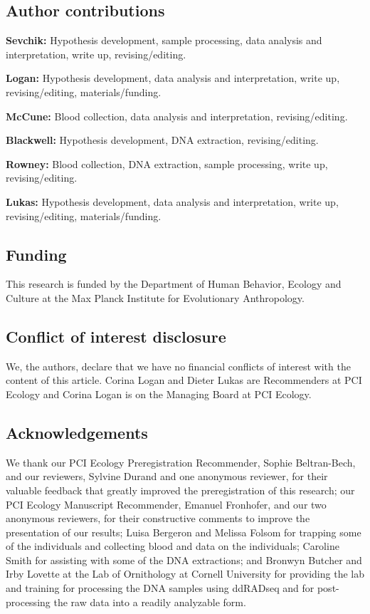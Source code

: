 \documentclass[
]{article}
\begin{document}
\hypertarget{author-contributions}{%
\subsection{Author contributions}\label{author-contributions}}

\textbf{Sevchik:} Hypothesis development, sample processing, data
analysis and interpretation, write up, revising/editing.

\textbf{Logan:} Hypothesis development, data analysis and
interpretation, write up, revising/editing, materials/funding.

\textbf{McCune:} Blood collection, data analysis and interpretation,
revising/editing.

\textbf{Blackwell:} Hypothesis development, DNA extraction,
revising/editing.

\textbf{Rowney:} Blood collection, DNA extraction, sample processing,
write up, revising/editing.

\textbf{Lukas:} Hypothesis development, data analysis and
interpretation, write up, revising/editing, materials/funding.

\hypertarget{funding}{%
\subsection{Funding}\label{funding}}

This research is funded by the Department of Human Behavior, Ecology and
Culture at the Max Planck Institute for Evolutionary Anthropology.

\hypertarget{conflict-of-interest-disclosure}{%
\subsection{Conflict of interest
disclosure}\label{conflict-of-interest-disclosure}}

We, the authors, declare that we have no financial conflicts of interest
with the content of this article. Corina Logan and Dieter Lukas are
Recommenders at PCI Ecology and Corina Logan is on the Managing Board at
PCI Ecology.

\hypertarget{acknowledgements}{%
\subsection{Acknowledgements}\label{acknowledgements}}

We thank our PCI Ecology Preregistration Recommender, Sophie
Beltran-Bech, and our reviewers, Sylvine Durand and one anonymous
reviewer, for their valuable feedback that greatly improved the
preregistration of this research; our PCI Ecology Manuscript
Recommender, Emanuel Fronhofer, and our two anonymous reviewers, for
their constructive comments to improve the presentation of our results;
Luisa Bergeron and Melissa Folsom for trapping some of the individuals
and collecting blood and data on the individuals; Caroline Smith for
assisting with some of the DNA extractions; and Bronwyn Butcher and Irby
Lovette at the Lab of Ornithology at Cornell University for providing
the lab and training for processing the DNA samples using ddRADseq and
for post-processing the raw data into a readily analyzable form.
\end{document}
